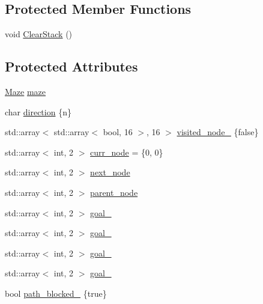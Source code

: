 \subsection*{Protected Member Functions}
\begin{DoxyCompactItemize}
\item 
void \hyperlink{classfp_1_1_algorithm_ac289d75b6850d5ad4a888360b3cfeda9}{Clear\+Stack} ()
\end{DoxyCompactItemize}
\subsection*{Protected Attributes}
\begin{DoxyCompactItemize}
\item 
\hyperlink{classfp_1_1_maze}{Maze} \hyperlink{classfp_1_1_algorithm_a5eaa9074986ebf65f2f549f78eedd0f2}{maze}
\item 
char \hyperlink{classfp_1_1_algorithm_afdbf632b658aea1aef75caa90e60a8fc}{direction} \{\textquotesingle{}n\textquotesingle{}\}
\item 
std\+::array$<$ std\+::array$<$ bool, 16 $>$, 16 $>$ \hyperlink{classfp_1_1_algorithm_a41904cf962dd8c46901d39ab03d77545}{visited\+\_\+node\+\_\+} \{false\}
\item 
std\+::array$<$ int, 2 $>$ \hyperlink{classfp_1_1_algorithm_a88395e8c0b52c4aef33b41caff21300c}{curr\+\_\+node} = \{0, 0\}
\item 
std\+::array$<$ int, 2 $>$ \hyperlink{classfp_1_1_algorithm_ac3672498d86469ee445fe66a140952cb}{next\+\_\+node}
\item 
std\+::array$<$ int, 2 $>$ \hyperlink{classfp_1_1_algorithm_ac90048223f33b81908e9c7367ec355bc}{parent\+\_\+node}
\item 
std\+::array$<$ int, 2 $>$ \hyperlink{classfp_1_1_algorithm_a9fcc4bf2df720fef33da5705cd317480}{goal\+\_}
\item 
std\+::array$<$ int, 2 $>$ \hyperlink{classfp_1_1_algorithm_aa01beb678f2db28d33e32f1060341bcc}{goal\+\_}
\item 
std\+::array$<$ int, 2 $>$ \hyperlink{classfp_1_1_algorithm_a8e8b41783484c3a30ae85bcd978d5e46}{goal\+\_}
\item 
std\+::array$<$ int, 2 $>$ \hyperlink{classfp_1_1_algorithm_a9832306da6877eba455ef5160c4a7f86}{goal\+\_}
\item 
bool \hyperlink{classfp_1_1_algorithm_a7a37ba8431c685c42f305a73812efecb}{path\+\_\+blocked\+\_\+} \{true\}
\end{DoxyCompactItemize}


